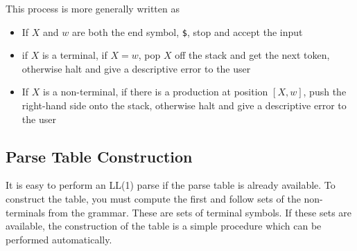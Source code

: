 This process is more generally written as
\begin{itemize}
  \item If $X$ and $w$ are both the end symbol, \verb`$`, stop and accept the input
  \item if $X$ is a terminal, if $X = w$, pop $X$ off the stack and get the next token, otherwise halt and give a
   descriptive error to the user
  \item If $X$ is a non-terminal, if there is a production at position $[X, w]$, push the right-hand side onto the stack,
   otherwise halt and give a descriptive error to the user
\end{itemize}

\subsection*{Parse Table Construction}

It is easy to perform an LL(1) parse if the parse table is already available. To construct the table, you must compute
 the first and follow sets of the non-terminals from the grammar. These are sets of terminal symbols. If these sets are
 available, the construction of the table is a simple procedure which can be performed automatically.